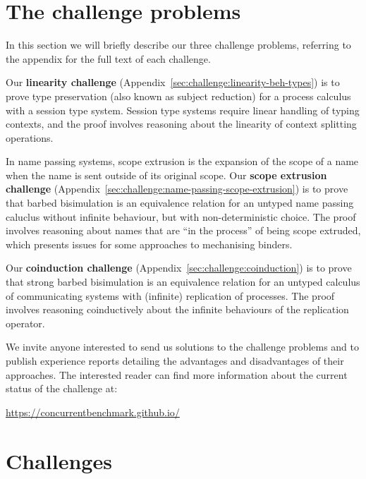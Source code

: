 \documentclass[submission,copyright,creativecommons]{eptcs}
\begin{document}
\section{The challenge problems}
In this section we will briefly describe our three challenge problems, referring to the appendix for the full text of each challenge.

Our \textbf{linearity challenge} (Appendix~\ref{sec:challenge:linearity-beh-types}) is to prove type preservation (also known as subject reduction) for a process calculus with a session type system.
Session type systems require linear handling of typing contexts, and the proof involves reasoning about the linearity of context splitting operations.

In name passing systems, scope extrusion is the expansion of the scope of a name when the name is sent outside of its original scope.
Our \textbf{scope extrusion challenge} (Appendix~\ref{sec:challenge:name-passing-scope-extrusion}) is to prove that barbed bisimulation is an equivalence relation for an untyped name passing caluclus without infinite behaviour, but with non-deterministic choice.
The proof involves reasoning about names that are ``in the process'' of being scope extruded, which presents issues for some approaches to mechanising binders.

Our \textbf{coinduction challenge} (Appendix~\ref{sec:challenge:coinduction}) is to prove that strong barbed bisimulation is an equivalence relation for an untyped calculus of communicating systems with (infinite) replication of processes.
The proof involves reasoning coinductively about the infinite behaviours of the replication operator.

We invite anyone interested to send us solutions to the challenge problems and to publish experience reports detailing the advantages and disadvantages of their approaches.
The interested reader can find more information about the current status of the challenge at:
\begin{center}
  \url{https://concurrentbenchmark.github.io/}
\end{center}




\appendix

\section{Challenges}

\end{document}
